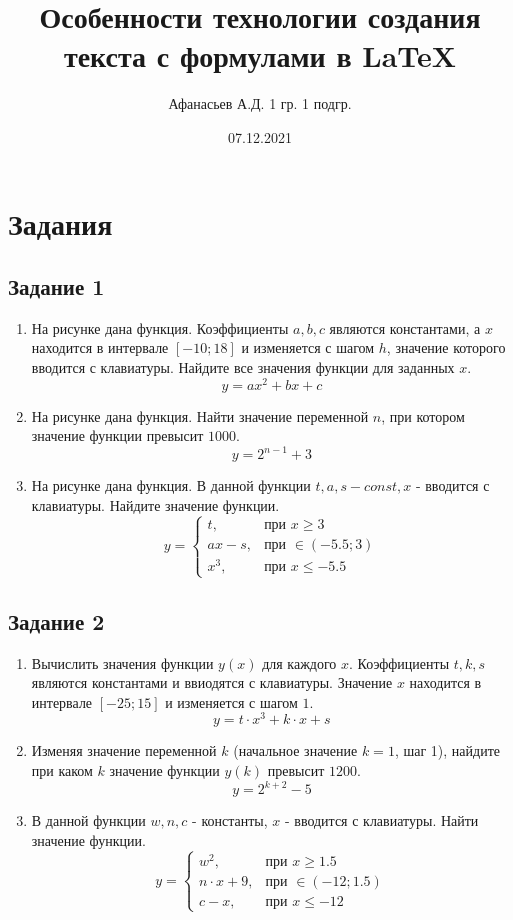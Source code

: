 \documentclass[a4paper,12pt]{article} %
\author{Афанасьев А.Д. 1 гр. 1 подгр.}
\title{Особенности технологии создания текста с формулами в \LaTeX{}}
\date{07.12.2021}
\begin{document}
\maketitle
\newpage
\section{Задания}
\subsection{Задание 1}
\begin{enumerate} 
  \item 
  На рисунке дана функция. Коэффициенты $a, b, c$ являются константами, а $x$ находится в интервале $[-10; 18]$ и изменяется с шагом $h$, значение которого вводится с клавиатуры. Найдите все значения функции для заданных $x$. $$y = ax^{2}+bx+c$$
  \item
  На рисунке дана функция. Найти значение переменной $n$, при котором значение функции превысит $1000$. $$y = 2^{n-1}+3$$
  \item
  На рисунке дана функция. В данной функции $t, a, s - const, x$ - вводится с клавиатуры. Найдите значение функции.
    \begin{equation*}
        y = 
        \begin{cases}
            t, &\text{при $x\geq 3$}\\
            ax-s, &\text{при $\in (-5.5;3)$}\\
            x^{3}, &\text{при $x\leq -5.5$}
        \end{cases}
    \end{equation*}
\end{enumerate}
\subsection{Задание 2}
\begin{enumerate} 
    \item
    Вычислить значения функции $y(x)$ для каждого $x$. Коэффициенты $t, k, s$ являются константами и ввиодятся с клавиатуры. Значение $x$ находится в интервале $[-25; 15]$ и изменяется с шагом $1$.
    $$y = t\cdot x^{3} + k\cdot x + s$$
    \item
    Изменяя значение переменной $k$ (начальное значение $k=1$, шаг 1), найдите при каком $k$ значение функции $y(k)$ превысит $1200$.
    $$y = 2^{k+2}-5$$
    \item
    В данной функции $w, n, c$ - константы, $x$ - вводится с клавиатуры. Найти значение функции.
    \begin{equation*}
        y = 
        \begin{cases}
            w^{2}, &\text{при $x\geq 1.5$}\\
            n\cdot x+9, &\text{при $\in (-12;1.5)$}\\
            c-x, &\text{при $x\leq -12$}
        \end{cases}
    \end{equation*}
\end{enumerate}
\end{document}
